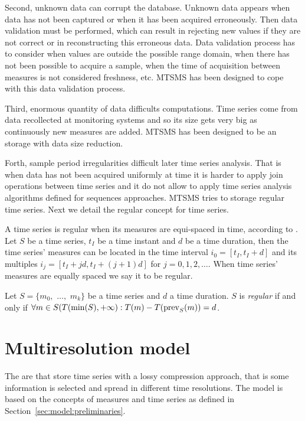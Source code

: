 Second, unknown data can corrupt the database. Unknown data appears
when data has not been captured or when it has been acquired
erroneously. Then data validation must be performed, which can result
in rejecting new values if they are not correct or in reconstructing
this erroneous data.  Data validation process has to consider when
values are outside the possible range domain, when there has not been
possible to acquire a sample, when the time of acquisition between
measures is not considered freshness, etc. MTSMS has been designed to
cope with this data validation process.


Third, enormous quantity of data difficults computations.  Time series
come from data recollected at monitoring systems and so its size gets
very big as continuously new measures are added.  MTSMS has been designed to 
be an storage with data size reduction.


Forth, sample period irregularities difficult later time series
analysis. That is when data has not been acquired uniformly at time it
is harder to apply join operations between time series and it do not
allow to apply time series analysis algorithms defined for sequences
approaches.  MTSMS tries to storage regular time series.  Next we
detail the regular concept for time series.


A time series is regular when its measures are equi-spaced in time,
according to \cite{last:hetland}. Let $S$ be a time series, $t_I$
be a time instant and $d$ be a time duration, then the time
series' measures can be located in the time interval $i_0=[t_I,
t_I+d]$ and its multiples $i_j=[t_I+jd, t_I+(j+1)d]$
for $j=0,1,2,\ldots$. When time series' measures are equally spaced we
say it to be regular.

\begin{definition}
  Let $S=\{m_0,$ $\ldots,$ $m_k\}$ be a time series and $d$ a time
  duration. $S$ is \emph{regular} if and only if $\forall m \in
  S(T(\min(S),+\infty):T(m) - T(\operatorname*{prev}_S(m)) = d$.
\end{definition}





\section{Multiresolution model}
\label{sec:MTSMS}


The  are  that store time series with a lossy
compression approach, that is some information is selected and spread in
different time resolutions. The  model is based on the
concepts of measures and time series as defined in
Section~\ref{sec:model:preliminaries}.


